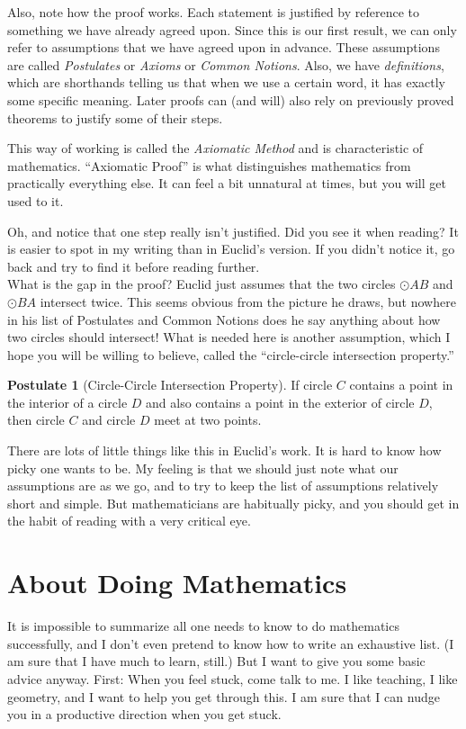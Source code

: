 \documentclass{tufte-handout}
\theoremstyle{definition}
\newtheorem*{postulate}{Postulate}
\begin{document}
Also, note how the proof works. Each statement is justified by reference to something we have already agreed upon. Since this is our first result, we can only refer to assumptions that we have agreed upon in advance. These assumptions are called \emph{Postulates} or \emph{Axioms} or \emph{Common Notions}. Also, we have \emph{definitions}, which are shorthands telling us that when we use a certain word, it has exactly some specific meaning. Later proofs can (and will) also rely on previously proved theorems to justify some of their steps.

This way of working is called the \emph{Axiomatic Method} and is characteristic of mathematics. ``Axiomatic Proof'' is what distinguishes mathematics from practically everything else. It can feel a bit unnatural at times, but you will get used to it.

Oh, and notice that one step really isn't justified. Did you see it when reading? It is easier to spot in my writing than in Euclid's version. If you didn't notice it, go back and try to find it before reading further. \\

What is the gap in the proof? Euclid just assumes that the two circles $\odot AB$ and $\odot BA$ intersect twice. This seems obvious from the picture he draws, but nowhere in his list of Postulates and Common Notions does he say anything about how two circles should intersect! What is needed here is another assumption, which I hope you will be willing to believe, called the ``circle-circle intersection property.'' 
\begin{postulate}[Circle-Circle Intersection Property] If circle $C$ contains a point in the interior of a circle $D$ and also contains a point in the exterior of circle $D$, then circle $C$ and circle $D$ meet at two points. 
\end{postulate}
There are lots of little things like this in Euclid's work. It is hard to know how picky one wants to be. My feeling is that we should just note what our assumptions are as we go, and to try to keep the list of assumptions relatively short and simple. But mathematicians are habitually picky, and you should get in the habit of reading with a very critical eye.


\section*{About Doing Mathematics}
 It is impossible to summarize all one needs to know to do mathematics successfully, and I don't even pretend to know how to write an exhaustive list. (I am sure that I have much to learn, still.) But I want to give you some basic advice anyway. First: When you feel stuck, come talk to me. I like teaching, I like geometry, and I want to help you get through this. I am sure that I can nudge you in a productive direction when you get stuck.
\end{document}

